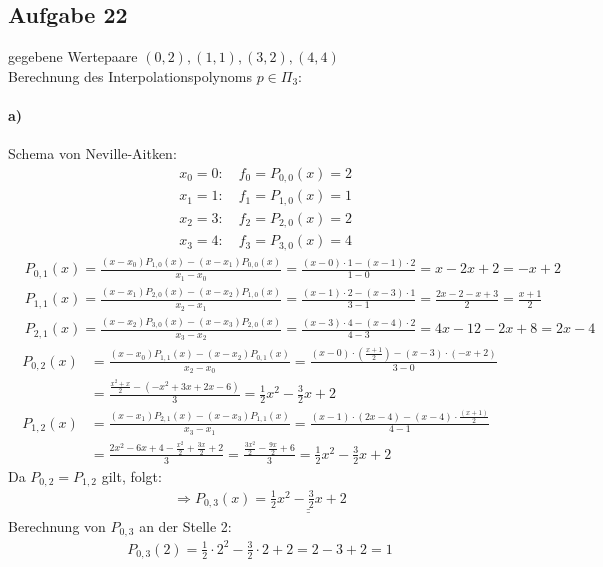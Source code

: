 \subsection*{Aufgabe 22}
gegebene Wertepaare $(0,2), (1,1), (3,2), (4,4)$\\
Berechnung des Interpolationspolynoms $p\in \Pi_3$:

\paragraph*{a)}
Schema von Neville-Aitken:
\begin{align*}
&x_0=0: \quad f_0=P_{0,0}(x)=2\\
&x_1=1: \quad f_1=P_{1,0}(x)=1\\
&x_2=3: \quad f_2=P_{2,0}(x)=2\\
&x_3=4: \quad f_3=P_{3,0}(x)=4
\end{align*}
\begin{align*}
&P_{0,1}(x)=\frac{(x-x_0)P_{1,0}(x)-(x-x_1)P_{0,0}(x)}{x_1-x_0}=\frac{(x-0)\cdot 1 -(x-1)\cdot2}{1-0}= x-2x+2=-x+2\\
&P_{1,1}(x)=\frac{(x-x_1)P_{2,0}(x)-(x-x_2)P_{1,0}(x)}{x_2-x_1}=\frac{(x-1)\cdot 2 -(x-3)\cdot 1}{3-1}= \frac{2x-2-x+3}{2}=\frac{x+1}{2}\\
&P_{2,1}(x)=\frac{(x-x_2)P_{3,0}(x)-(x-x_3)P_{2,0}(x)}{x_3-x_2}=\frac{(x-3)\cdot 4 -(x-4)\cdot 2}{4-3}= 4x-12-2x+8=2x-4
\end{align*}
\begin{align*}
P_{0,2}(x)&=\frac{(x-x_0)P_{1,1}(x)-(x-x_2)P_{0,1}(x)}{x_2-x_0}=\frac{(x-0)\cdot (\frac{x+1}{2}) -(x-3) \cdot(-x+2)}{3-0}\\ &=\frac{\frac{x^2+x}{2}-(-x^2+3x+2x-6)}{3}=\frac{1}{2}x^2-\frac{3}{2}x+2\\
P_{1,2}(x)&=\frac{(x-x_1)P_{2,1}(x)-(x-x_3)P_{1,1}(x)}{x_3-x_1}=\frac{(x-1)\cdot (2x-4) -(x-4) \cdot\frac{(x+1)}{2}}{4-1}\\ &=\frac{2x^2-6x+4-\frac{x^2}{2}+\frac{3x}{2}+2}{3}=\frac{\frac{3x^2}{2}-\frac{9x}{2}+6}{3}=\frac{1}{2}x^2-\frac{3}{2}x+2
\end{align*}
Da $P_{0,2}=P_{1,2}$ gilt, folgt:
\begin{align*}
\Rightarrow P_{0,3}(x)=\underline{\underline{\frac{1}{2}x^2-\frac{3}{2}x+2}}
\end{align*}
Berechnung von $P_{0,3}$ an der Stelle 2:
\begin{align*}
P_{0,3}(2)=\frac{1}{2}\cdot 2^2-\frac{3}{2}\cdot 2+2=2-3+2=1
\end{align*}
